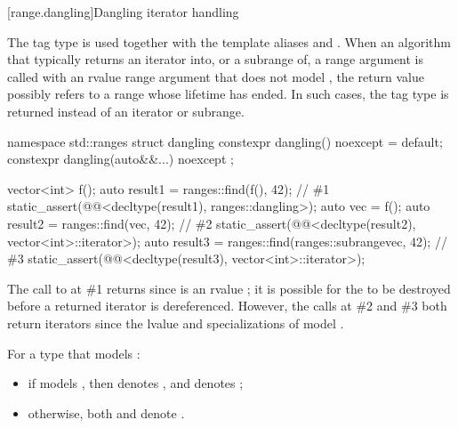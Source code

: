 [range.dangling]{Dangling iterator handling}

\pnum
The tag type  is used together with the template aliases
 and .
When an algorithm
that typically returns an iterator into, or a subrange of, a range argument
is called with an rvalue range argument
that does not model ,
the return value possibly refers to a range whose lifetime has ended.
In such cases,
the tag type  is returned instead of an iterator or subrange.
%
\begin{codeblock}
namespace std::ranges {
  struct dangling {
    constexpr dangling() noexcept = default;
    constexpr dangling(auto&&...) noexcept {}
  };
}
\end{codeblock}

\pnum
\begin{example}
\begin{codeblock}
vector<int> f();
auto result1 = ranges::find(f(), 42);                                   // \#1
static_assert(@@<decltype(result1), ranges::dangling>);
auto vec = f();
auto result2 = ranges::find(vec, 42);                                   // \#2
static_assert(@@<decltype(result2), vector<int>::iterator>);
auto result3 = ranges::find(ranges::subrange{vec}, 42);                 // \#3
static_assert(@@<decltype(result3), vector<int>::iterator>);
\end{codeblock}
The call to  at \#1 returns 
since  is an rvalue ;
it is possible for the  to be destroyed
before a returned iterator is dereferenced.
However, the calls at \#2 and \#3 both return iterators
since the lvalue  and specializations of 
model .
\end{example}

\pnum
For a type  that models :
\begin{itemize}
\item
if  models , then
 denotes , and
 denotes ;
\item
otherwise,
both  and 
denote .
\end{itemize}

